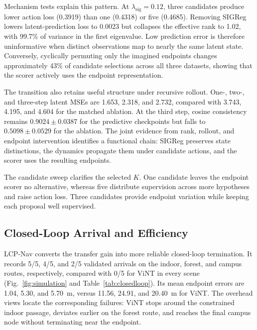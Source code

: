 \documentclass[conference]{IEEEtran}
\begin{document}
Mechanism tests explain this pattern. At $\lambda_{\mathrm{sig}}=0.12$, three candidates produce lower action loss (0.3919) than one (0.4318) or five (0.4685). Removing SIGReg lowers latent-prediction loss to 0.0023 but collapses the effective rank to 1.02, with 99.7\% of variance in the first eigenvalue. Low prediction error is therefore uninformative when distinct observations map to nearly the same latent state. Conversely, cyclically permuting only the imagined endpoints changes approximately 43\% of candidate selections across all three datasets, showing that the scorer actively uses the endpoint representation.

The transition also retains useful structure under recursive rollout. One-, two-, and three-step latent MSEs are 1.653, 2.318, and 2.732, compared with 3.743, 4.195, and 4.604 for the matched ablation. At the third step, cosine consistency remains $0.9024\pm0.0387$ for the predictive checkpoints but falls to $0.5098\pm0.0529$ for the ablation. The joint evidence from rank, rollout, and endpoint intervention identifies a functional chain: SIGReg preserves state distinctions, the dynamics propagate them under candidate actions, and the scorer uses the resulting endpoints.

The candidate sweep clarifies the selected $K$. One candidate leaves the endpoint scorer no alternative, whereas five distribute supervision across more hypotheses and raise action loss. Three candidates provide endpoint variation while keeping each proposal well supervised.

\subsection{Closed-Loop Arrival and Efficiency}

LCP-Nav converts the transfer gain into more reliable closed-loop termination. It records 5/5, 4/5, and 2/5 validated arrivals on the indoor, forest, and campus routes, respectively, compared with 0/5 for ViNT in every scene (Fig.~\ref{fig:simulation} and Table~\ref{tab:closedloop}). Its mean endpoint errors are 1.04, 5.30, and 5.70~m, versus 11.56, 24.91, and 20.40~m for ViNT. The overhead views locate the corresponding failures: ViNT stops around the constrained indoor passage, deviates earlier on the forest route, and reaches the final campus node without terminating near the endpoint.
\end{document}
